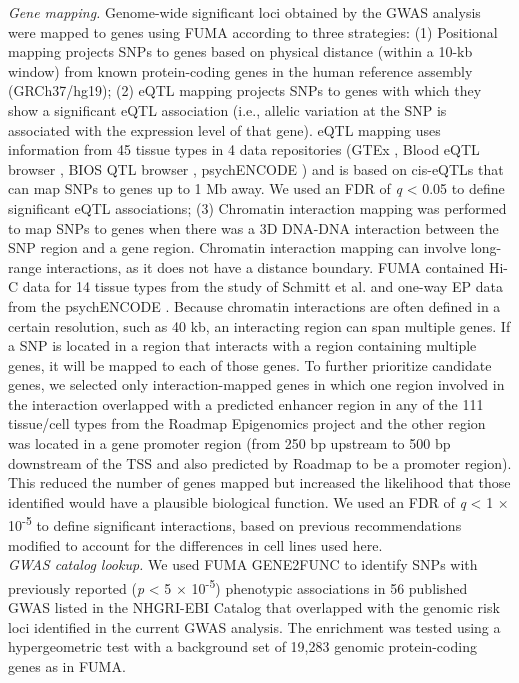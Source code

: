 \begin{refsection}
\noindent
\textit{Gene mapping.} Genome-wide significant loci obtained by the GWAS analysis were mapped to genes using FUMA \citep{watanabe2017functional} according to three strategies: (1) Positional mapping projects SNPs to genes based on physical distance (within a 10-kb window) from known protein-coding genes in the human reference assembly (GRCh37/hg19); (2) eQTL mapping projects SNPs to genes with which they show a significant eQTL association (i.e., allelic variation at the SNP is associated with the expression level of that gene). eQTL mapping uses information from 45 tissue types in 4 data repositories (GTEx \citep{Ardlie2015TheGE}, Blood eQTL browser \citep{Westra2013SystematicIO}, BIOS QTL browser \citep{Zhernakova2017IdentificationOC}, psychENCODE \citep{wang2018comprehensive}) and is based on cis-eQTLs that can map SNPs to genes up to 1 Mb away. We used an FDR of \textit{q} < 0.05 to define significant eQTL associations; (3) Chromatin interaction mapping was performed to map SNPs to genes when there was a 3D DNA-DNA interaction between the SNP region and a gene region. Chromatin interaction mapping can involve long-range interactions, as it does not have a distance boundary. FUMA contained Hi-C data for 14 tissue types from the study of Schmitt et al. \citep{Schmitt2016ACO} and one-way EP data from the psychENCODE \citep{wang2018comprehensive}. Because chromatin interactions are often defined in a certain resolution, such as 40 kb, an interacting region can span multiple genes. If a SNP is located in a region that interacts with a region containing multiple genes, it will be mapped to each of those genes. To further prioritize candidate genes, we selected only interaction-mapped genes in which one region involved in the interaction overlapped with a predicted enhancer region in any of the 111 tissue/cell types from the Roadmap Epigenomics project \citep{Consortium2015IntegrativeAO} and the other region was located in a gene promoter region (from 250 bp upstream to 500 bp downstream of the TSS and also predicted by Roadmap to be a promoter region). This reduced the number of genes mapped but increased the likelihood that those identified would have a plausible biological function. We used an FDR of \textit{q} < 1 $ \times $  10\textsuperscript{-5} to define significant interactions, based on previous recommendations \citep{Schmitt2016ACO} modified to account for the differences in cell lines used here.\\

\noindent
\textit{GWAS catalog lookup.} We used FUMA GENE2FUNC \citep{watanabe2017functional} to identify SNPs with previously reported (\textit{p} < 5 $ \times $  10\textsuperscript{-5}) phenotypic associations in 56 published GWAS listed in the NHGRI-EBI Catalog \citep{MacArthur2017TheNN} that overlapped with the genomic risk loci identified in the current GWAS analysis. The enrichment was tested using a hypergeometric test with a background set of 19,283 genomic protein-coding genes as in FUMA. \\


\end{refsection}
